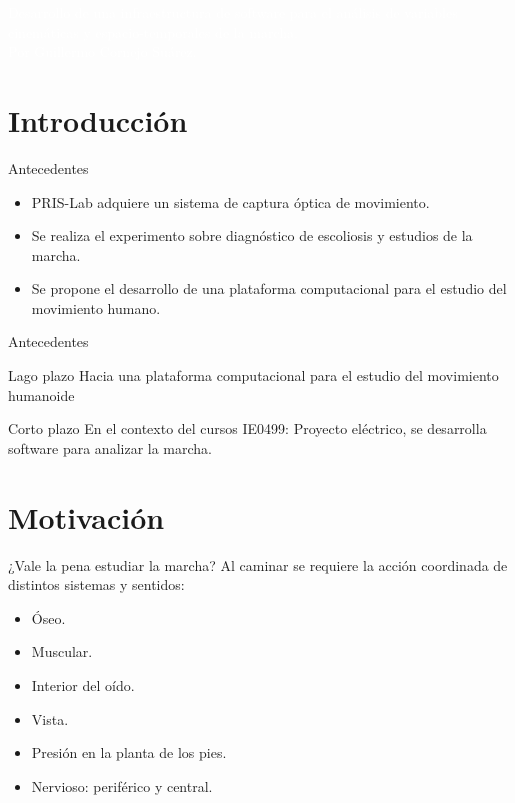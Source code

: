 \documentclass[aspectratio=169,spanish]{beamer} %
\newcommand{\fullbackground}[1]{\usebackgroundtemplate{\texttt{[image: \#1]}}}
\begin{document}
\fullbackground{images/opening.png}

\begin{frame}
\vspace{6cm}
\centering
\textcolor{white}{%
Desarrollo de una infraestructura de software para el análisis de variables cinemáticas y espacio-temporales de la marcha. \\ \vspace{1cm}
Por Guillermo Cornejo Suárez. 
}
\end{frame}

\fullbackground{images/slide.png}

\section{Introducción}

\begin{frame}{Antecedentes}
    \begin{itemize}
        \item PRIS-Lab adquiere un sistema de captura óptica de movimiento.
        \item Se realiza el experimento sobre diagnóstico de escoliosis y estudios de la marcha.
        \item Se propone el desarrollo de una plataforma computacional para el estudio del movimiento humano. 
    \end{itemize}
\end{frame}

\begin{frame}{Antecedentes}
    \begin{block}{Lago plazo}
        Hacia una plataforma computacional para el estudio del movimiento humanoide
    \end{block}
    \begin{block}{Corto plazo}
        En el contexto del cursos IE0499: Proyecto eléctrico, se desarrolla software para analizar la marcha. 
    \end{block}
\end{frame}

\section{Motivación}

\begin{frame}{¿Vale la pena estudiar la marcha?}
    Al caminar se requiere la acción coordinada de distintos sistemas y sentidos:
    \begin{itemize}
        \item Óseo.
        \item Muscular.
        \item Interior del oído.
        \item Vista.
        \item Presión en la planta de los pies.
        \item Nervioso: periférico y central. 
    \end{itemize}
\end{frame}
\end{document}
